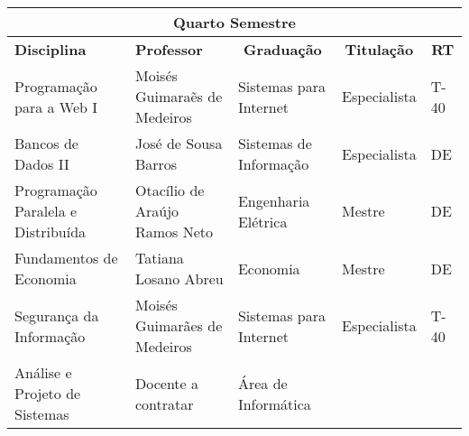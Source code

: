 \begin{table}[h!]
\scriptsize
\begin{tabular}{lllll}
\multicolumn{5}{c}{\cellcolor[HTML]{C0C0C0}\textbf{Quarto Semestre}}                                                                                                                                                                                                                                    \\ \hline
\multicolumn{1}{|p{5cm}|}{\cellcolor[HTML]{FFFFFF}\textbf{Disciplina}}                                    & \multicolumn{1}{p{5cm}|}{\textbf{Professor}}                 & \multicolumn{1}{c|}{\textbf{Graduação}}     & \multicolumn{1}{c|}{\textbf{Titulação}} & \multicolumn{1}{c|}{\textbf{RT}} \\ \hline
\multicolumn{1}{|l|}{Programa\c{c}\~ao para a Web I}                                                            & \multicolumn{1}{l|}{Mois\'es Guimara\~es de Medeiros}             & \multicolumn{1}{l|}{Sistemas para Internet}          & \multicolumn{1}{l|}{Especialista}             & \multicolumn{1}{l|}{T-40}                          \\ \hline
\multicolumn{1}{|l|}{Bancos de Dados II} & \multicolumn{1}{l|}{Jos\'e de Sousa Barros}        & \multicolumn{1}{l|}{Sistemas de Informa\c{c}\~ao}             & \multicolumn{1}{l|}{Especialista}             & \multicolumn{1}{l|}{DE}                          \\ \hline
\multicolumn{1}{|l|}{\cellcolor[HTML]{FFFFFF}Programa\c{c}\~ao Paralela e Distribu\'ida}                         & \multicolumn{1}{l|}{Otac\'ilio de Ara\'ujo Ramos Neto}   & \multicolumn{1}{l|}{Engenharia El\'etrica}             & \multicolumn{1}{l|}{Mestre}             & \multicolumn{1}{l|}{DE}                        \\ \hline
\multicolumn{1}{|l|}{Fundamentos de Economia}                                             & \multicolumn{1}{l|}{Tatiana Losano Abreu}                 & \multicolumn{1}{l|}{Economia}  & \multicolumn{1}{l|}{Mestre}             & \multicolumn{1}{l|}{DE}                          \\ \hline
\multicolumn{1}{|l|}{Seguran\c{c}a da Informa\c{c}\~ao}                                                      & \multicolumn{1}{l|}{Mois\'es Guimar\~aes de Medeiros} & \multicolumn{1}{l|}{Sistemas para Internet}  & \multicolumn{1}{l|}{Especialista}             & \multicolumn{1}{l|}{T-40}                          \\ \hline
\multicolumn{1}{|l|}{An\'alise e Projeto de Sistemas}                                                         & \multicolumn{1}{l|}{Docente a contratar}       & \multicolumn{1}{l|}{\'Area de Inform\'atica} & \multicolumn{1}{l|}{}       & \multicolumn{1}{l|}{}                        \\ \hline
\end{tabular}
\end{table}


